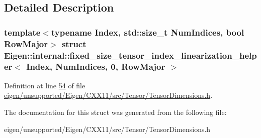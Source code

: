 \subsection{Detailed Description}
\subsubsection*{template$<$typename Index, std\+::size\+\_\+t Num\+Indices, bool Row\+Major$>$\newline
struct Eigen\+::internal\+::fixed\+\_\+size\+\_\+tensor\+\_\+index\+\_\+linearization\+\_\+helper$<$ Index, Num\+Indices, 0, Row\+Major $>$}



Definition at line \hyperlink{eigen_2unsupported_2_eigen_2_c_x_x11_2src_2_tensor_2_tensor_dimensions_8h_source_l00054}{54} of file \hyperlink{eigen_2unsupported_2_eigen_2_c_x_x11_2src_2_tensor_2_tensor_dimensions_8h_source}{eigen/unsupported/\+Eigen/\+C\+X\+X11/src/\+Tensor/\+Tensor\+Dimensions.\+h}.



The documentation for this struct was generated from the following file\+:\begin{DoxyCompactItemize}
\item 
eigen/unsupported/\+Eigen/\+C\+X\+X11/src/\+Tensor/\+Tensor\+Dimensions.\+h\end{DoxyCompactItemize}
